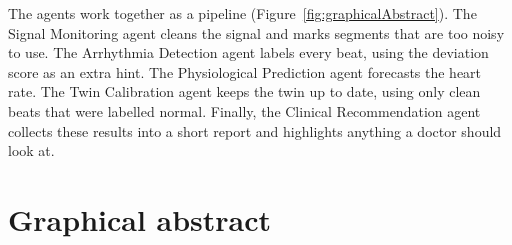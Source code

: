 The agents work together as a pipeline (Figure~\ref{fig:graphicalAbstract}). The Signal Monitoring agent cleans the signal and marks segments that are too noisy to use. The Arrhythmia Detection agent labels every beat, using the deviation score as an extra hint. The Physiological Prediction agent forecasts the heart rate. The Twin Calibration agent keeps the twin up to date, using only clean beats that were labelled normal. Finally, the Clinical Recommendation agent collects these results into a short report and highlights anything a doctor should look at.

\section{Graphical abstract}
\label{section:graphicalAbstract}


